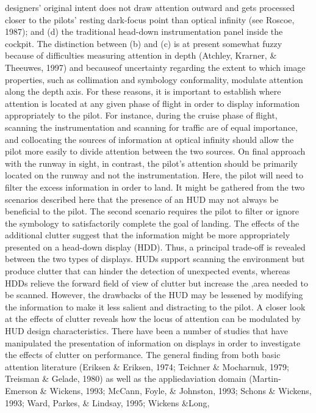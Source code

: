 \documentclass[utf8,bachelor,manualbib]{gradu3}
\begin{document}
designers' original intent does not draw attention outward and gets processed closer
to the pilots' resting dark-focus point than optical infinity (see Roscoe, 1987); and
(d) the traditional head-down instrumentation panel inside the cockpit. The distinction
between (b) and (c) is at present somewhat fuzzy because of difficulties
measuring attention in depth (Atchley, Krarner, \& Theeuwes, 1997) and becauseof uncertainty regarding the extent to which image properties, such as collimation
and symbology conformality, modulate attention along the depth axis. For these
reasons, it is important to establish where attention is located at any given phase of
flight in order to display information appropriately to the pilot. For instance, during
the cruise phase of flight, scanning the instrumentation and scanning for traffic are
of equal importance, and collocating the sources of information at optical infinity
should allow the pilot more easily to divide attention between the two sources. On
final approach with the runway in sight, in contrast, the pilot's attention should be
primarily located on the runway and not the instrumentation. Here, the pilot will
need to filter the excess information in order to land.
It might be gathered from the two scenarios described here that the presence of
an HUD may not always be beneficial to the pilot. The second scenario requires
the pilot to filter or ignore the symbology to satisfactorily complete the goal of
landing. The effects of the additional clutter suggest that the information might be
more appropriately presented on a head-down display (HDD). Thus, a principal
trade-off is revealed between the two types of displays. HUDs support scanning
the environment but produce clutter that can hinder the detection of unexpected
events, whereas HDDs relieve the forward field of view of clutter but increase the
,area needed to be scanned. However, the drawbacks of the HUD may be lessened
by modifying the information to make it less salient and distracting to the pilot. A
closer look at the effects of clutter reveals how the locus of attention can be
modulated by HUD design characteristics.
There have been a number of studies that have manipulated the presentation of
information on displays in order to investigate the effects of clutter on performance.
The general finding from both basic attention literature (Eriksen \& Eriksen, 1974;
Teichner \& Mocharnuk, 1979; Treisman \& Gelade, 1980) as well as the appliedaviation
domain (Martin-Emerson \& Wickens, 1993; McCann, Foyle, \& Johnston,
1993; Schons \& Wickens, 1993; Ward, Parkes, \& Lindsay, 1995; Wickens \&Long,
\end{document}

